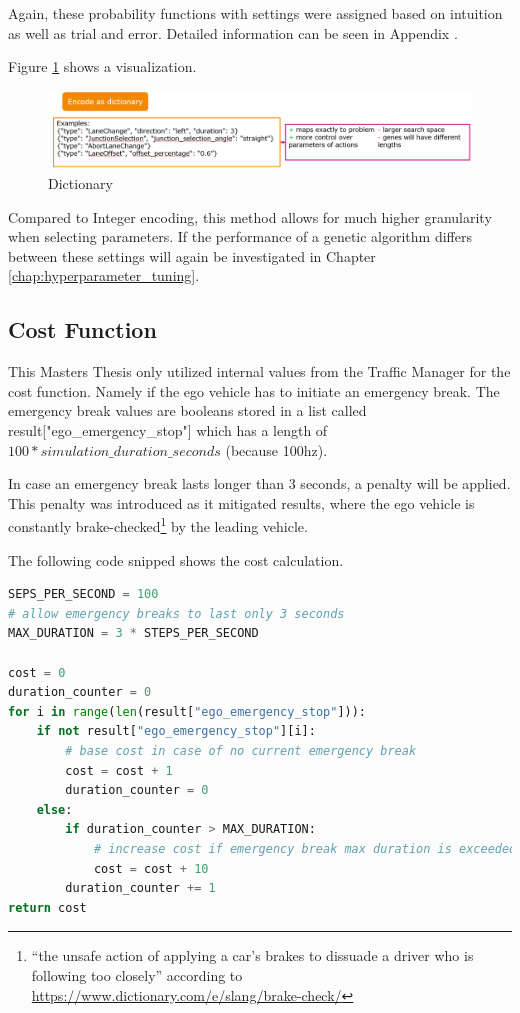 Again, these probability functions with settings were assigned based on intuition as well as trial and error. Detailed information can be seen in Appendix .

Figure \ref{figure:encoding:gene:dict} shows a visualization.

\begin{figure}[ht] 
	\includegraphics[width=1\linewidth]{figures/dict_encoding}
	\caption{Dictionary}
	\label{figure:encoding:gene:dict}
\end{figure}

Compared to Integer encoding, this method allows for much higher granularity when selecting parameters. If the performance of a genetic algorithm differs between these settings will again be investigated in Chapter \ref{chap:hyperparameter_tuning}.

\subsection{Cost Function}
\label{implementation:cost_function}
This Masters Thesis only utilized internal values from the Traffic Manager for the cost function. Namely if the ego vehicle has to initiate an emergency break. The emergency break values are booleans stored in a list called result["ego\_emergency\_stop"] which has a length of $100 * simulation\_duration\_seconds$ (because 100hz). 

In case an emergency break lasts longer than 3 seconds, a penalty will be applied. This penalty was introduced as it mitigated results, where the ego vehicle is constantly brake-checked\footnote{\enquote{the unsafe action of applying a car’s brakes to dissuade a driver who is following too closely} according to \href{https://www.dictionary.com/e/slang/brake-check/}{https://www.dictionary.com/e/slang/brake-check/}} by the leading vehicle.

The following code snipped shows the cost calculation.
\begin{lstlisting}[language=Python, tabsize=4]
SEPS_PER_SECOND = 100
# allow emergency breaks to last only 3 seconds
MAX_DURATION = 3 * STEPS_PER_SECOND

cost = 0
duration_counter = 0
for i in range(len(result["ego_emergency_stop"])):
	if not result["ego_emergency_stop"][i]:
		# base cost in case of no current emergency break
		cost = cost + 1
		duration_counter = 0
	else:
		if duration_counter > MAX_DURATION:
			# increase cost if emergency break max duration is exceeded
			cost = cost + 10
		duration_counter += 1
return cost
\end{lstlisting}


